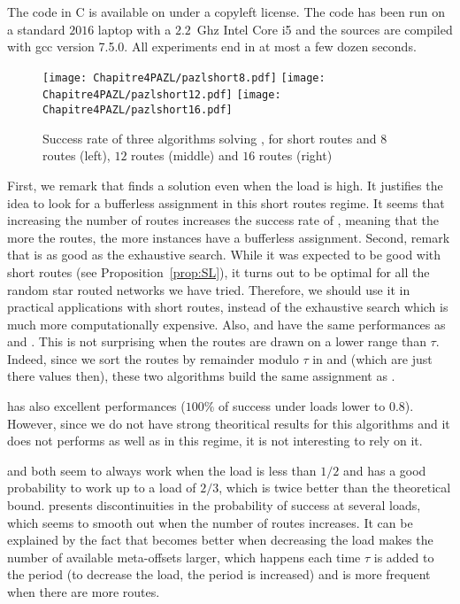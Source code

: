      The code in C is available on \cite{webpage} under a copyleft license. The code has been run on a standard $2016$ laptop with a $2.2$~Ghz Intel Core i5 and the sources are compiled with gcc version 7.5.0. All experiments end in at most a few dozen seconds.



      \begin{figure}[h]
      \begin{center}
   \texttt{[image: Chapitre4PAZL/pazlshort8.pdf]}
   \texttt{[image: Chapitre4PAZL/pazlshort12.pdf]}
   \texttt{[image: Chapitre4PAZL/pazlshort16.pdf]}
      \end{center}
      \caption{Success rate of three algorithms solving \pma, for short routes and $8$ routes (left), $12$ routes (middle) and $16$ routes (right)}\label{fig:short}
      \end{figure}

      First, we remark that \ESCA finds a solution even when the load is high. It justifies the idea to look for a bufferless assignment in this short routes regime. It seems that increasing the number of routes increases the success rate of \ESCA, meaning that the more the routes, the more instances have a bufferless assignment. 
      Second, remark that \shortestlongest is as good as the exhaustive search. While it was expected to be good with short routes (see Proposition~\ref{prop:SL}), it turns out to be optimal for all the random star routed networks we have tried. Therefore, we should use it in practical applications with short routes, instead of the exhaustive search which is much more computationally expensive. 
      Also, \compactpair and \compactfit have the same performances as \ESCA and \shortestlongest. This is not surprising when the routes are drawn on a lower range than $\tau$. Indeed, since we sort the routes by remainder modulo $\tau$  in \compactpair and \compactfit (which are just there values then), these two algorithms build the same assignment as \shortestlongest.

       \firstfit has also excellent performances ($100\%$ of success under loads lower to $0.8$). However, since we do not have strong theoritical results for this algorithms and it does not performs as well as \shortestlongest in this regime, it is not interesting to rely on it.

      \metaoffset and \greedyuniform both seem to always work when the load is less than $1/2$ and has a good probability to work up to a load of $2/3$, which is twice better than the theoretical bound. \metaoffset presents discontinuities in the probability of success at several loads, which seems to smooth out when the number of routes increases. It can be explained by the fact that \metaoffset becomes better when decreasing the load makes the number of available meta-offsets larger, which happens each time $\tau$ is added to the period (to decrease the load, the period is increased) and is more frequent when there are more routes.
      
